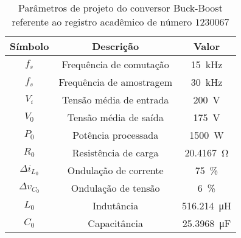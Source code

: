 \begin{table}[!ht]
\centering
\caption{Parâmetros de projeto do conversor Buck-Boost referente ao registro acadêmico de número $1230067$}
\label{tab:parametros}
\begin{tabular}{@{}ccc@{}}
\toprule
\textbf{Símbolo} & \textbf{Descrição} & \textbf{Valor}\\ \midrule
$f_s$ & Frequência de comutação & \SI{15}{\kilo\hertz}\\
$f_s$ & Frequência de amostragem & \SI{30}{\kilo\hertz}\\
$V_i$ & Tensão média de entrada  & \SI{200}{\V}\\
$V_0$ & Tensão média de saída  & \SI{175}{\V} \\
$P_0$ & Potência processada  & \SI{1500}{\W} \\
$R_0$ & Resistência de carga & \SI{20.4167}{\ohm} \\
$\Delta{i_{L_0}}$  & Ondulação de corrente & \SI{75}{\%}\\
$\Delta{v_{C_0}}$  & Ondulação de tensão & \SI{6}{\%}\\
$L_0$ & Indutância & \SI{516.214}{\micro\henry}\\
$C_0$ & Capacitância & \SI{25.3968}{\micro\farad}\\
\bottomrule
\end{tabular}
\end{table}


